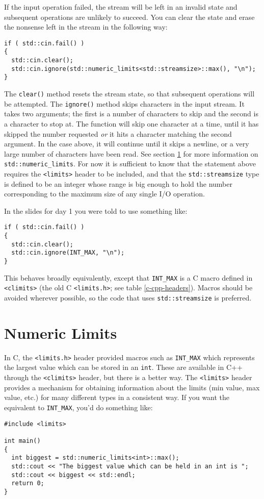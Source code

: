 \documentclass[a4paper]{scrartcl}
\begin{document}
If the input operation failed, the stream will be left in an invalid state and subsequent operations are unlikely to succeed. You can clear the state and erase the nonsense left in the stream in the following way:
\begin{verbatim}
if ( std::cin.fail() )
{
  std::cin.clear();
  std::cin.ignore(std::numeric_limits<std::streamsize>::max(), "\n");
}
\end{verbatim}
The \texttt{clear()} method resets the stream state, so that subsequent operations will be attempted. The \texttt{ignore()} method skips characters in the input stream. It takes two arguments; the first is a number of characters to skip and the second is a character to stop at. The function will skip one character at a time, until it has skipped the number requested \emph{or} it hits a character matching the second argument. In the case above, it will continue until it skips a newline, or a very large number of characters have been read. See section \ref{numeric-limits} for more information on \texttt{std::numeric\_limits}. For now it is sufficient to know that the statement above requires the \texttt{<limits>} header to be included, and that the \texttt{std::streamsize} type is defined to be an integer whose range is big enough to hold the number corresponding to the maximum size of any single I/O operation.

In the slides for day 1 you were told to use something like:
\begin{verbatim}
if ( std::cin.fail() )
{
  std::cin.clear();
  std::cin.ignore(INT_MAX, "\n");
}
\end{verbatim}
This behaves broadly equivalently, except that \texttt{INT\_MAX} is a C macro defined in \texttt{<climits>} (the old C \texttt{<limits.h>}; see table \ref{c-cpp-headers}). Macros should be avoided wherever possible, so the code that uses \texttt{std::streamsize} is preferred.

\section{Numeric Limits}\label{numeric-limits}
In C, the \texttt{<limits.h>} header provided macros such as \texttt{INT\_MAX} which represents the largest value which can be stored in an \texttt{int}. These are available in C++ through the \texttt{<climits>} header, but there is a better way. The \texttt{<limits>} header provides a mechanism for obtaining information about the limits (min value, max value, etc.) for many different types in a consistent way. If you want the equivalent to \texttt{INT\_MAX}, you'd do something like:
\begin{verbatim}
#include <limits>

int main()
{
  int biggest = std::numeric_limits<int>::max();
  std::cout << "The biggest value which can be held in an int is ";
  std::cout << biggest << std::endl;
  return 0;
}
\end{verbatim}
\end{document}
